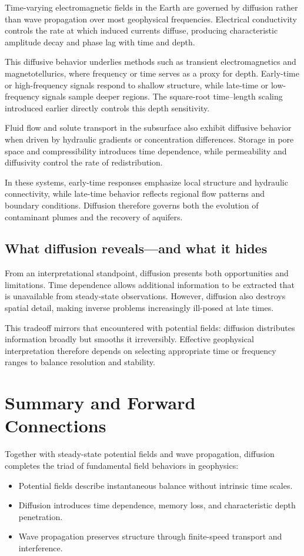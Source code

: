 Time-varying electromagnetic fields in the Earth are governed by diffusion rather than wave propagation over most geophysical frequencies. Electrical conductivity controls the rate at which induced currents diffuse, producing characteristic amplitude decay and phase lag with time and depth.

This diffusive behavior underlies methods such as transient electromagnetics and magnetotellurics, where frequency or time serves as a proxy for depth. Early-time or high-frequency signals respond to shallow structure, while late-time or low-frequency signals sample deeper regions. The square-root time--length scaling introduced earlier directly controls this depth sensitivity.

Fluid flow and solute transport in the subsurface also exhibit diffusive behavior when driven by hydraulic gradients or concentration differences. Storage in pore space and compressibility introduces time dependence, while permeability and diffusivity control the rate of redistribution.

In these systems, early-time responses emphasize local structure and hydraulic connectivity, while late-time behavior reflects regional flow patterns and boundary conditions. Diffusion therefore governs both the evolution of contaminant plumes and the recovery of aquifers.

\subsection{What diffusion reveals—and what it hides}

From an interpretational standpoint, diffusion presents both opportunities and limitations. Time dependence allows additional information to be extracted that is unavailable from steady-state observations. However, diffusion also destroys spatial detail, making inverse problems increasingly ill-posed at late times.

This tradeoff mirrors that encountered with potential fields: diffusion distributes information broadly but smooths it irreversibly. Effective geophysical interpretation therefore depends on selecting appropriate time or frequency ranges to balance resolution and stability.

\section{Summary and Forward Connections}

Together with steady-state potential fields and wave propagation, diffusion completes the triad of fundamental field behaviors in geophysics:
\begin{itemize}
    \item Potential fields describe instantaneous balance without intrinsic time
    scales.
    \item Diffusion introduces time dependence, memory loss, and characteristic
    depth penetration.
    \item Wave propagation preserves structure through finite-speed transport and
    interference.
\end{itemize}


